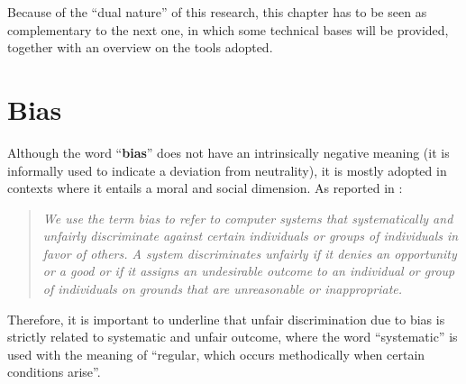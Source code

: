 Because of the ``dual nature'' of this research, this chapter has to be seen as complementary to the next one, in which some technical bases will be provided, together with an overview on the tools adopted.


\section{Bias}
\label{section:bias}
Although the word ``\textbf{bias}'' does not have an intrinsically negative meaning (it is informally used to indicate a deviation from neutrality), it is mostly adopted in contexts where it entails a moral and social dimension. As reported in \cite{friedman2017bias}:
\begin{quote}\emph{We use the term bias to refer to computer systems that \emph{systematically} and \emph{unfairly discriminate} against certain individuals or groups of individuals in favor of others. A system discriminates unfairly if it denies an opportunity or a good or if it assigns an undesirable outcome to an individual or group of individuals on grounds that are unreasonable or inappropriate.} \cite[p.~332]{friedman2017bias}\end{quote}
Therefore, it is important to underline that unfair discrimination due to bias is strictly related to systematic and unfair outcome, where the word ``systematic'' is used with the meaning of ``regular, which occurs methodically when certain conditions arise''.

